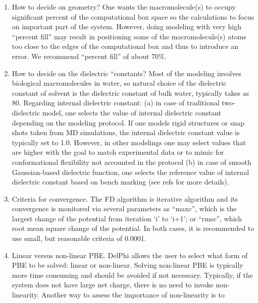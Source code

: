 \documentclass[9pt,tutorial]{livecoms}
\begin{document}
\begin{enumerate}
    \item How to decide on geometry? One wants the macromolecule(s) to occupy significant percent of the computational box space so the calculations to focus on important part of the system. However, doing modeling with very high “percent fill” may result in positioning some of the macromolecule(s) atoms too close to the edges of the computational box and thus to introduce an error. We recommend “percent fill” of about 70\%. 

    \item How to decide on the dielectric “constants? Most of the modeling involves biological macromolecules in water, so natural choice of the dielectric constant of solvent is the dielectric constant of bulk water, typically takes as 80. Regarding internal dielectric constant: (a) in case of traditional two-dielectric model, one selects the value of internal dielectric constant depending on the modeling protocol. If one models rigid structures or snap shots taken from MD simulations, the internal dielectric constant value is typically set to 1.0. However, in other modelings one may select values that are higher with the goal to match experimental data or to mimic for conformational flexibility not accounted in the protocol (b) in case of smooth Gaussian-based dielectric function, one selects the reference value of internal dielectric constant based on bench marking (see refs\cite{li2014modeling,li2013progress,wang2015pka,wang2015delphipka} for more details).  

    \item Criteria for convergence. The FD algorithm is iterative algorithm and its convergence is monitored via several parameters as “maxc”, which is the largest change of the potential from iteration ‘i’ to ‘i+1’; or “rmsc”, which root mean square change of the potential. In both cases, it is recommended to use small, but reasonable criteria of 0.0001. 

    \item Linear versus non-linear PBE. DelPhi allows the user to select what form of PBE to be solved: linear or non-linear. Solving non-linear PBE is typically more time consuming and should be avoided if not necessary. Typically, if the system does not have large net charge, there is no need to invoke non-linearity\cite{talley2008electrostatic,chakavorty2016electrostatic}. Another way to assess the importance of non-linearity is to
\end{enumerate}
\end{document}
